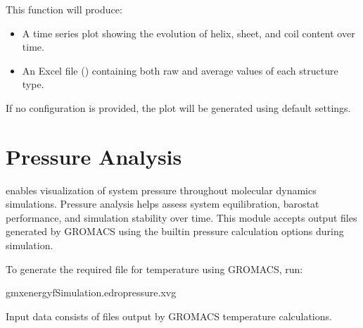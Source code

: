 \documentclass[a4paper,10pt,english]{sphinxmanual}
\begin{document}
\begin{sphinxVerbatim}[commandchars=\\\{\}]
  
\end{sphinxVerbatim}

\sphinxAtStartPar
This function will produce:
\begin{itemize}
\item {} 
\sphinxAtStartPar
A time series plot showing the evolution of helix, sheet, and coil content over time.

\item {} 
\sphinxAtStartPar
An Excel file () containing both raw and average values of each structure type.

\end{itemize}

\sphinxAtStartPar
If no configuration is provided, the plot will be generated using default settings.


\section{Pressure Analysis}
\label{\detokenize{Input:pressure-analysis}}
\sphinxAtStartPar
{} enables visualization of system pressure throughout molecular dynamics simulations. Pressure analysis helps assess system equilibration, barostat performance, and simulation stability over time. This module accepts  output files generated by GROMACS using the built\sphinxhyphen{}in pressure calculation options during simulation.

\sphinxAtStartPar
To generate the required  file for temperature using GROMACS, run:

\begin{sphinxVerbatim}[commandchars=\\\{\}]
gmxenergy\PYGZhy{}fSimulation.edr\PYGZhy{}opressure.xvg
\end{sphinxVerbatim}

\sphinxAtStartPar
Input data consists of  files output by GROMACS temperature calculations.

\sphinxAtStartPar
{}
\end{document}
